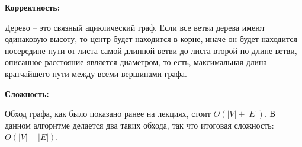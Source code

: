\documentclass[12pt]{extreport}
\begin{document}
\bigskip 
{\bf Корректность:}

Дерево -- это связный ациклический граф. Если все ветви дерева имеют одинаковую высоту, то центр будет находится в корне, иначе он будет находится посередине пути от листа самой длинной ветви до листа второй по длине ветви, описанное расстояние является диаметром, то есть, максимальная длина кратчайшего пути между всеми вершинами графа. 

\bigskip 
{\bf Сложность:} 

Обход графа, как было показано ранее на лекциях, стоит $O(|V|+|E|)$. В данном алгоритме делается два таких обхода, так что итоговая сложность: $O(|V|+|E|)$.
\end{document}
